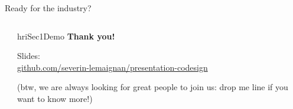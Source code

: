 \documentclass[xcolor=table]{beamer}
\begin{document}
\begin{frame}{Ready for the industry?}
\begin{columns}
\begin{column}{0.5\linewidth}
\begin{center}
            \end{center}
        \end{column}
    \end{columns}


\end{frame}


{
    \begin{frame}[plain]

        \begin{columns}
            \begin{column}{0.5\linewidth}
            \end{column}
            \begin{column}{0.5\linewidth}

                \vspace{14em}
                \begin{beamercolorbox}[wd=\linewidth,ht=6ex,dp=0.7ex]{hriSec1Demo}
                    \textbf{Thank you!}

                    \vspace{4em}

                    \footnotesize
                    Slides:\\
                    \href{https://github.com/severin-lemaignan/presentation-codesign}{github.com/severin-lemaignan/presentation-codesign}

                    \vspace{2em}

                    (btw, we are always looking for great people to join us: drop me line if you want to know more!)

                \end{beamercolorbox}
            \end{column}
        \end{columns}
    \end{frame}
}

\appendix
{}
\end{document}
